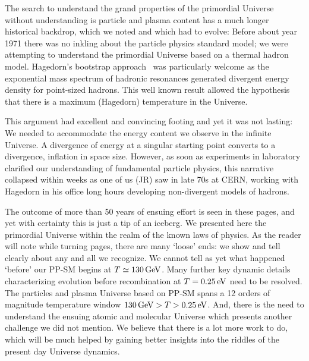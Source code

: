 The search to understand the grand properties of the primordial Universe without understanding is particle and plasma content has a much longer historical backdrop, which we noted and which had to evolve: Before about year 1971 there was no inkling about the particle physics standard model; we were attempting to understand the primordial Universe based on a thermal hadron model. Hagedorn's bootstrap approach~\cite{Rafelski:2016hnq} was particularly welcome as the exponential mass spectrum of hadronic resonances generated divergent energy density for point-sized hadrons. This well known result allowed the hypothesis that there is a maximum (Hagedorn) temperature in the Universe. 

This argument had excellent and convincing footing and yet it was not lasting: We needed to accommodate the energy content we observe in the infinite Universe. A divergence of energy at a singular starting point converts to a divergence, inflation in space size. However, as soon as experiments in laboratory clarified our understanding of fundamental particle physics, this narrative collapsed within weeks as one of us (JR) saw in late 70s at CERN, working with Hagedorn in his office long hours developing non-divergent models of hadrons. 

The outcome of more than 50 years of ensuing effort is seen in these pages, and yet with certainty this is just a tip of an iceberg. We presented here the primordial Universe within the realm of the known laws of physics. As the reader will note while  turning pages, there are many `loose' ends: we show and tell clearly about any and all we recognize. We cannot tell as yet what happened `before' our PP-SM begins at $T\simeq 130\text{\,GeV}$. Many further key dynamic details characterizing evolution before recombination at $T=0.25\text{\,eV}$ need to be resolved. The particles and plasma Universe based on PP-SM spans a 12 orders of magnitude temperature window $ 130\text{\,GeV} > T > 0.25\text{\,eV} $. And, there is the need to understand the ensuing atomic and molecular Universe which presents another challenge we did not mention. We believe that there is a lot more work to do, which will be much helped by gaining better insights into the riddles of the present day Universe dynamics.